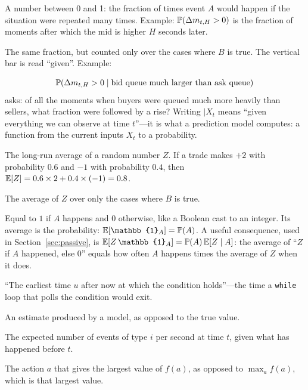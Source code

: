 \begin{description}[leftmargin=1.5em,style=nextline,itemsep=2pt]
\item[{$\P(A)$, ``the probability of $A$''}] A number between 0 and 1: the fraction of times event
  $A$ would happen if the situation were repeated many times. Example: $\P(\Delta m_{t,H} > 0)$ is
  the fraction of moments after which the mid is higher $H$ seconds later.
\item[{$\P(A \mid B)$, ``the probability of $A$ given $B$''}] The same fraction, but counted only
  over the cases where $B$ is true. The vertical bar is read ``given''. Example:
  
\[
  \P(\Delta m_{t,H} > 0 \mid \text{bid queue much larger than ask queue})
\]
asks: of all the moments
  when buyers were queued much more heavily than sellers, what fraction were followed by a rise?
  Writing $\mid X_t$ means ``given everything we can observe at time $t$''---it is what a
  prediction model computes: a function from the current inputs $X_t$ to a probability.
\item[{$\E[Z]$, ``the expected value of $Z$''}] The long-run average of a random number $Z$. If a
  trade makes $+2$ with probability $0.6$ and $-1$ with probability $0.4$, then
  $\E[Z] = 0.6 \times 2 + 0.4 \times (-1) = 0.8$.
\item[{$\E[Z \mid B]$}] The average of $Z$ over only the cases where $B$ is true.
\item[{$\mathbb{1}_A$, the indicator of $A$}] Equal to $1$ if $A$ happens and $0$ otherwise, like a
  Boolean cast to an integer. Its average is the probability: $\E[\mathbb{1}_A] = \P(A)$. A useful
  consequence, used in Section~\ref{sec:passive}, is
  $\E[Z\,\mathbb{1}_A] = \P(A)\,\E[Z \mid A]$: the average of ``$Z$ if $A$ happened, else 0'' equals
  how often $A$ happens times the average of $Z$ when it does.
\item[{$\inf\{u > 0 : \text{condition}\}$}] ``The earliest time $u$ after now at which the condition
  holds''---the time a \texttt{while} loop that polls the condition would exit.
\item[{A hat, as in $\widehat{Y}_t$}] An estimate produced by a model, as opposed to the true value.
\item[{$\lambda_i(t)$, the intensity of events of type $i$}] The expected number of events of type $i$ per second at
  time $t$, given what has happened before $t$.
\item[{$\arg\max_a f(a)$}] The action $a$ that gives the largest value of $f(a)$, as opposed to $\max_a f(a)$, which
  is that largest value.
\end{description}

